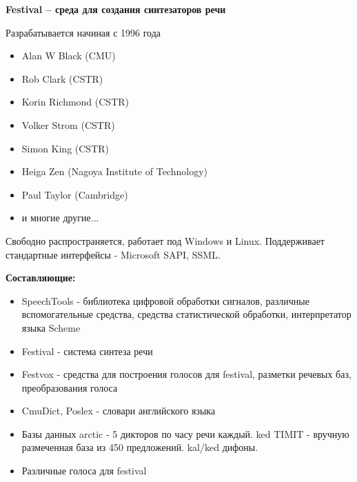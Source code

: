 \documentclass{seminar}
\begin{document}
\sffamily


\begin{slide}


\end{slide}

\begin{slide}

{\bf Festival -- среда для создания синтезаторов речи}

Разрабатывается начиная с 1996 года
\begin{itemize}
\item Alan W Black (CMU)
\item Rob Clark (CSTR)
\item Korin Richmond (CSTR)
\item Volker Strom (CSTR)
\item Simon King (CSTR)
\item Heiga Zen (Nagoya Institute of Technology)
\item Paul Taylor (Cambridge)
\item и многие другие...
\end{itemize}

Свободно распространяется, работает под Windows и Linux. Поддерживает
стандартные интерфейсы - Microsoft SAPI, SSML.

\end{slide}

\begin{slide}
\textbf{Составляющие:}
\begin{itemize}
\item SpeechTools - библиотека цифровой обработки сигналов, различные вспомогательные средства, средства статистической обработки, интерпретатор языка Scheme
\item Festival - система синтеза речи
\item Festvox - средства для построения голосов для festival, разметки речевых баз, преобразования голоса
\item CmuDict, Poslex - словари английского языка
\item Базы данных arctic - 5 дикторов по часу речи каждый. ked TIMIT - 
вручную размеченная база из 450 предложений. kal/ked дифоны.
\item Различные голоса для festival
\end{itemize}

\end{slide}
\end{document}
